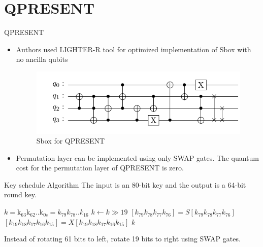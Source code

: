 \section{QPRESENT}

\begin{frame}{QPRESENT}
\begin{itemize}
    \item Authors used LIGHTER-R tool \cite{LighterR} for optimized implementation of Sbox with no ancilla qubits 
    \begin{figure}[h!]
    \centering
    \includegraphics[width=\linewidth]{present/sbox.pdf}
    \caption{Sbox for QPRESENT}
    \label{fig:qpsbox}
\end{figure}
\pause
\item Permutation layer can be implemented using only SWAP gates. The quantum cost for the permutation layer of QPRESENT is zero.
\end{itemize}
\end{frame}
\begin{frame}{Key schedule Algorithm}
    The input is an 80-bit key and the output is a 64-bit round key.
    \pause
    \begin{codebox}
\label{proc:keqp}
\li $k = \mathrm{k_{63}}\mathrm{k_{62}}..\mathrm{k_{0s}} = k_{79}k_{78}..k_{16}$
\li $k \gets k \gg 19$
\li $[k_{79}k_{78}k_{77}k_{76}] = S[k_{79}k_{78}k_{77}k_{76}]$
\li $[k_{19}k_{18}k_{17}k_{16}k_{15}] = X[k_{19}k_{18}k_{17}k_{16}k_{15}]$
\li \Return $k$
\end{codebox}
 Instead of rotating 61 bits to left, rotate 19 bits to right using SWAP gates.
\end{frame}
